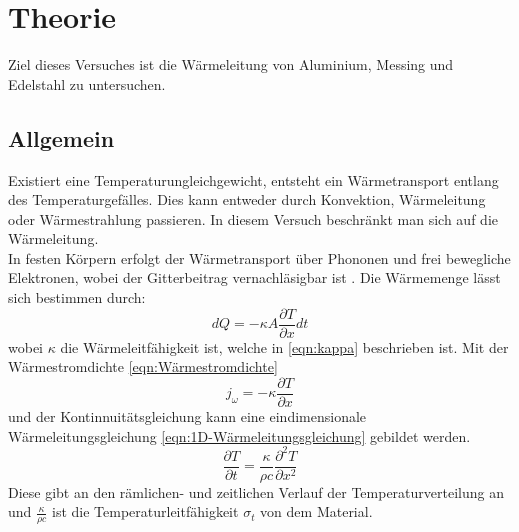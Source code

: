 \section{Theorie}
\label{sec:Theorie}
 
Ziel dieses Versuches ist die Wärmeleitung von Aluminium, Messing und Edelstahl zu untersuchen.

\subsection{Allgemein}

Existiert eine Temperaturungleichgewicht, entsteht ein Wärmetransport entlang des Temperaturgefälles. 
Dies kann entweder durch Konvektion, Wärmeleitung oder Wärmestrahlung passieren.
In diesem Versuch beschränkt man sich auf die Wärmeleitung.\\
In festen Körpern erfolgt der Wärmetransport über Phononen und frei bewegliche Elektronen, wobei der Gitterbeitrag vernachläsigbar ist \cite[1]{V204}.
Die Wärmemenge lässt sich bestimmen durch:
\begin{equation}
    dQ = -\kappa A \frac{\partial T}{\partial x} dt
    \label{eqn:Wärmemenge}
\end{equation}
wobei $\kappa$ die Wärmeleitfähigkeit ist, welche in \autoref{eqn:kappa} beschrieben ist.
Mit der Wärmestromdichte \autoref{eqn:Wärmestromdichte}
\begin{equation}
    j_{\omega} = -\kappa\frac{\partial T}{\partial x}
    \label{eqn:Wärmestromdichte}
\end{equation}
und der Kontinnuitätsgleichung kann eine eindimensionale Wärmeleitungsgleichung \autoref{eqn:1D-Wärmeleitungsgleichung} gebildet werden.
\begin{equation}
    \frac{\partial T}{\partial t} = \frac{\kappa}{\rho c} \frac{\partial ^2 T}{\partial x^2}
    \label{eqn:1D-Wärmeleitungsgleichung}
\end{equation}
Diese gibt an den rämlichen- und zeitlichen Verlauf der Temperaturverteilung an und $\frac{\kappa}{\rho c}$ ist die Temperaturleitfähigkeit $\sigma_t$ von dem Material.
